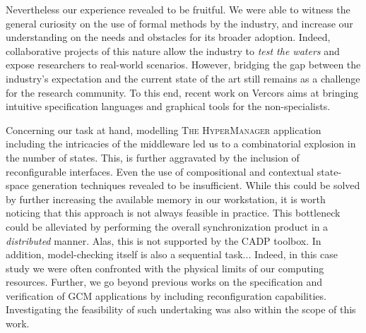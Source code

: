 		Nevertheless our experience revealed to be fruitful. We were able to witness 
		the general curiosity on the use of formal methods by the industry, 
		and increase our understanding on the needs and obstacles for its
		broader adoption. Indeed, collaborative projects of this nature	
		allow the industry to \textit{test the waters} and expose researchers 
		to real-world scenarios.	However, bridging the gap between the industry's 
		expectation and the current 
		state of the art still remains as a challenge for the research community. 
		To this end, recent work on \textsf{Vercors} \cite{olekvercors} aims at bringing
		intuitive specification languages and graphical tools 
		for the non-specialists. 
			
	
    Concerning our task at hand,	modelling
	\textsc{The HyperManager} application including the intricacies of the middleware
	led us to a combinatorial explosion in the number of states. This, is further
	aggravated by the inclusion of reconfigurable interfaces. Even the use of compositional and 
	contextual state-space generation techniques
	revealed to be insufficient. While this could be solved by further increasing
	the available memory in our workstation,
	it is worth noticing that this approach is not always feasible in practice.  This 
	bottleneck could be alleviated by performing the overall synchronization product 	
	in a \textit{distributed} manner. Alas, this is not supported by the CADP toolbox.	 
	In addition, model-checking itself is also a sequential task...	
	Indeed, in this case study we were often confronted with the physical limits of our 
	computing resources. Further, we go beyond previous works \cite{BHHM:FACS11} 
	on the specification and verification of \ac{GCM} applications by including 
	reconfiguration capabilities. Investigating the feasibility of such undertaking was also within 
	the scope of this work.
	
	
	
        
